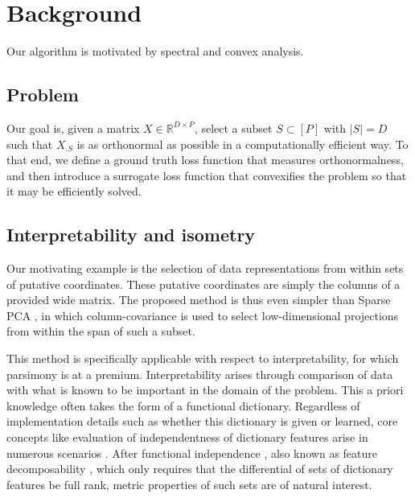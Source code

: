 \section{Background}

Our algorithm is motivated by spectral and convex analysis.

\subsection{Problem}

Our goal is, given a matrix $ X \in \mathbb R^{D \times P}$, select a subset $ S \subset [P]$ with $| S| = D$ such that $X_{.  S}$ is as orthonormal as possible in a computationally efficient way.
To that end, we define a ground truth loss function that measures orthonormalness, and then introduce a surrogate loss function that convexifies the problem so that it may be efficiently solved.

\subsection{Interpretability and isometry}

Our motivating example is the selection of data representations from within sets of putative coordinates.
These putative coordinates are simply the columns of a provided wide matrix.
The proposed method is thus even simpler than Sparse PCA \citep{Dey2017-mx, Bertsimas2022-qo, Bertsimas2022-dv}, in which column-covariance is used to select low-dimensional projections from within the span of such a subset.

This method is specifically applicable with respect to interpretability, for which parsimony is at a premium.
Interpretability arises through comparison of data with what is known to be important in the domain of the problem.
This a priori knowledge often takes the form of a functional dictionary.
Regardless of implementation details such as whether this dictionary is given or learned, core concepts like evaluation of independentness of dictionary features arise in numerous scenarios \citep{Chen2019-km, Koelle2022-ju, He2023-ch}.
After functional independence \citep{Koelle2022-ju}, also known as feature decomposability \citep{templeton2024scaling}, which only requires that the differential of sets of dictionary features be full rank, metric properties of such sets are of natural interest.

